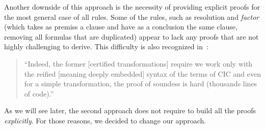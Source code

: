 Another downside of this approach is the necessity of providing explicit proofs for the most
general case of all rules. Some of the rules, such as resolution and
\textit{factor} (which takes as premiss a clause and have as a conclusion the same clause, removing
all formulas that are duplicated) appear to lack any proofs that are not highly challenging to derive.
This difficulty is also recognized in~\cite[p. 6]{snipe}:
\begin{quote}
  ``Indeed, the former [certified transformations] require we work only with the reified [meaning deeply embedded] syntax of the
  terms of CIC and even for a simple transformation, the proof of soundess is hard (thousands lines of code).''
\end{quote}

As we will see later, the second approach does not require to build all the proofs \textit{explicitly}.
For those reasons, we decided to change our approach.





